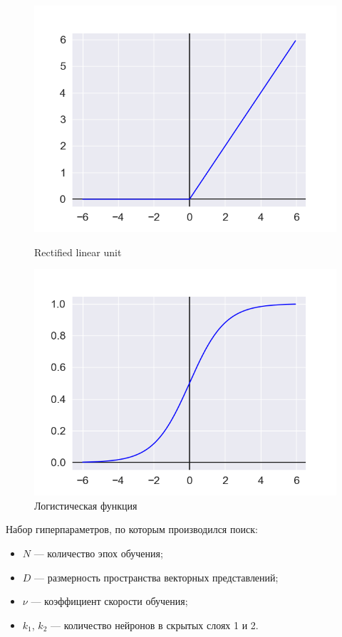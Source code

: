 \begin{figure}[h!]
\centering
\begin{minipage}{.5\textwidth}
\centering
\includegraphics[width=1.0\linewidth]{images/relu}
\caption{Rectified linear unit}
\label{fig:relu}
\end{minipage}%
\begin{minipage}{.5\textwidth}
\centering
\includegraphics[width=1.0\linewidth]{images/sigmoid}
\caption{Логистическая функция}
\label{fig:sigmoid}
\end{minipage}
\end{figure}

Набор гиперпараметров, по которым производился поиск:
\begin{itemize}
    \item $N$ --- количество эпох обучения;
    \item $D$ --- размерность пространства векторных представлений;
    \item $\nu$ --- коэффициент скорости обучения;
    \item $k_1$, $k_2$ --- количество нейронов в скрытых слоях 1 и 2.
\end{itemize}

